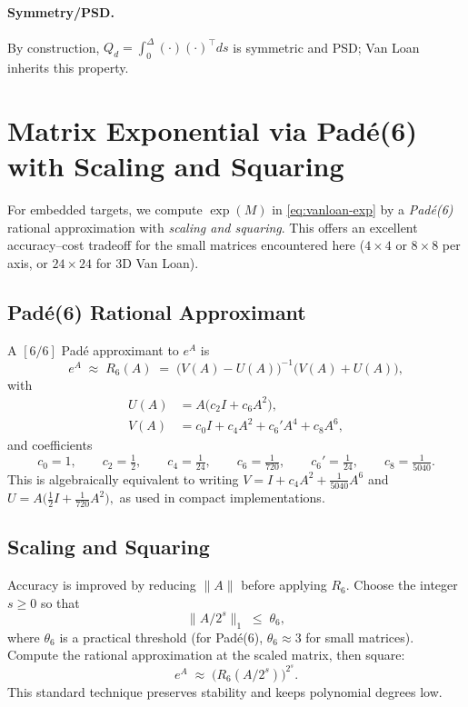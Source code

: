 \documentclass[10pt]{extarticle}
\begin{document}
\paragraph{Symmetry/PSD.} By construction, $Q_d= \int_0^\Delta (\cdot)(\cdot)^\top ds$ is symmetric and PSD; Van Loan inherits this property.
\vspace{1ex}

\section{Matrix Exponential via Pad\'e(6) with Scaling and Squaring}
\label{sec:pade6}

For embedded targets, we compute $\exp(M)$ in \eqref{eq:vanloan-exp} by a \emph{Pad\'e(6)} rational approximation
with \emph{scaling and squaring}. This offers an excellent accuracy--cost tradeoff for the
small matrices encountered here ($4\times 4$ or $8\times 8$ per axis, or $24\times 24$ for 3D Van Loan).

\subsection{Pad\'e(6) Rational Approximant}
A $[6/6]$ Pad\'e approximant to $e^A$ is
\begin{equation}
e^A \;\approx\; R_6(A) \;=\; \big(V(A)-U(A)\big)^{-1}\big(V(A)+U(A)\big),
\label{eq:pade-rational}
\end{equation}
with
\begin{align}
U(A) &= A\Big(c_2 I + c_6 A^2\Big), 
\label{eq:U-def}\\
V(A) &= c_0 I + c_4 A^2 + c_6' A^4 + c_8 A^6,
\label{eq:V-def}
\end{align}
and coefficients
\begin{equation}
c_0 = 1,\qquad c_2 = \tfrac{1}{2},\qquad c_4 = \tfrac{1}{24},\qquad
c_6 = \tfrac{1}{720},\qquad c_6'=\tfrac{1}{24},\qquad c_8 = \tfrac{1}{5040}.
\label{eq:pade-coeffs}
\end{equation}
This is algebraically equivalent to writing
\(
V= I + c_4 A^2 + \tfrac{1}{5040}A^6
\)
and
\(
U= A\big(\tfrac12 I + \tfrac{1}{720}A^2\big),
\)
as used in compact implementations.

\subsection{Scaling and Squaring}
Accuracy is improved by reducing $\|A\|$ before applying $R_6$. Choose the integer $s\ge 0$ so that
\begin{equation}
\|A/2^s\|_1 \;\le\; \theta_6,
\label{eq:theta-choice}
\end{equation}
where $\theta_6$ is a practical threshold (for Pad\'e(6), $\theta_6 \approx 3$ for small matrices).
Compute the rational approximation at the scaled matrix, then square:
\begin{equation}
e^A \;\approx\; \Big(R_6(A/2^s)\Big)^{2^s}.
\label{eq:scale-square}
\end{equation}
This standard technique preserves stability and keeps polynomial degrees low.
\end{document}
